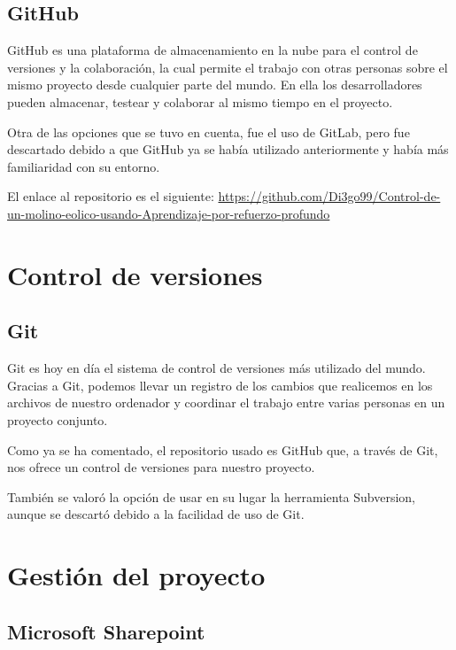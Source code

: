 \subsection{GitHub}

GitHub\cite{GitHub} es una plataforma de almacenamiento en la nube para el control de versiones y la colaboración, la cual permite el trabajo con otras personas sobre el mismo proyecto desde cualquier parte del mundo. En ella los desarrolladores pueden almacenar, testear y colaborar al mismo tiempo en el proyecto.

Otra de las opciones que se tuvo en cuenta, fue el uso de GitLab, pero fue descartado debido a que GitHub ya se había utilizado anteriormente y había más familiaridad con su entorno.

El enlace al repositorio es el siguiente:
\href{https://github.com/Di3go99/Control-de-un-molino-eolico-usando-Aprendizaje-por-refuerzo-profundo}{https://github.com/Di3go99/Control-de-un-molino-eolico-usando-Aprendizaje-por-refuerzo-profundo}


\section{Control de versiones}

\subsection{Git}

Git\cite{Git} es hoy en día el sistema de control de versiones más utilizado del mundo. Gracias a Git, podemos llevar un registro de los cambios que realicemos en los archivos de nuestro ordenador y coordinar el trabajo entre varias personas en un proyecto conjunto.

Como ya se ha comentado, el repositorio usado es GitHub que, a través de Git, nos ofrece un control de versiones para nuestro proyecto. 

También se valoró la opción de usar en su lugar la herramienta Subversion, aunque se descartó debido a la facilidad de uso de Git. 


\section{Gestión del proyecto}

\subsection{Microsoft Sharepoint}

